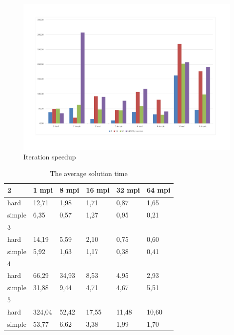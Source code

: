 \documentclass[runningheads]{llncs}
\begin{document}
\begin{figure} 
	\begin{center} 
		\begin{minipage}[h]{0.9\linewidth} 
			\includegraphics[width=1\linewidth]{figure/fig6.pdf} 
			\caption{Iteration speedup} %
			\label{fig:fig4} 
		\end{minipage} 
	\end{center} 
\end{figure}	


\begin{table}[!ht]
	\caption{The average solution time}
	\label{tab:1}
	\centering	
	\begin{tabular}{|l|l|l|l|l|l|}
		\hline
		2 & 1 mpi & 8 mpi & 16 mpi & 32 mpi & 64 mpi  \\ \hline
		hard & 12,71 & 1,98 & 1,71 & 0,87 & 1,65  \\ \hline
		simple & 6,35 & 0,57 & 1,27 & 0,95 & 0,21  \\ \hline
		3 & ~ & ~ & ~ & ~ &  \\ \hline
		hard & 14,19 & 5,59 & 2,10 & 0,75 & 0,60  \\ \hline
		simple & 5,92 & 1,63 & 1,17 & 0,38 & 0,41  \\ \hline
		4 & ~ & ~ & ~ & ~ &   \\ \hline
		hard & 66,29 & 34,93 & 8,53 & 4,95 & 2,93  \\ \hline
		simple & 31,88 & 9,44 & 4,71 & 4,67 & 5,51  \\ \hline
		5 & ~ & ~ & ~ & ~ &  \\ \hline
		hard & 324,04 & 52,42 & 17,55 & 11,48 & 10,60 \\ \hline
		simple & 53,77 & 6,62 & 3,38 & 1,99 & 1,70  \\ \hline
	\end{tabular}
\end{table}
\end{document}

